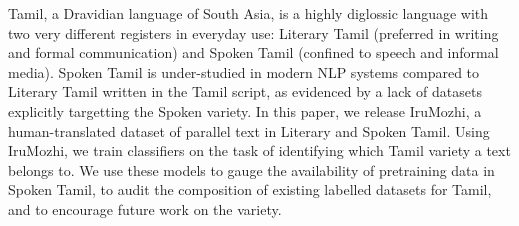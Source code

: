 Tamil, a Dravidian language of South Asia, is a highly diglossic language with two very different registers in everyday use: Literary Tamil (preferred in writing and formal communication) and Spoken Tamil (confined to speech and informal media). Spoken Tamil is under-studied in modern NLP systems compared to Literary Tamil written in the Tamil script, as evidenced by a lack of datasets explicitly targetting the Spoken variety. In this paper, we release IruMozhi, a human-translated dataset of parallel text in Literary and Spoken Tamil. Using IruMozhi, we train classifiers on the task of identifying which Tamil variety a text belongs to. We use these models to gauge the availability of pretraining data in Spoken Tamil, to audit the composition of existing labelled datasets for Tamil, and to encourage future work on the variety.